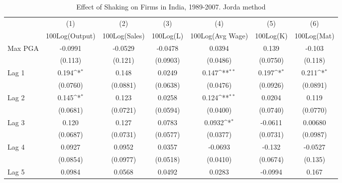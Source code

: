 \begin{table}[htbp]\centering
\def\sym#1{\ifmmode^{#1}\else\(^{#1}\)\fi}
\caption{Effect of Shaking on Firms in India, 1989-2007. Jorda method}
\begin{tabular}{l*{6}{c}}
\toprule
                &\multicolumn{1}{c}{(1)}&\multicolumn{1}{c}{(2)}&\multicolumn{1}{c}{(3)}&\multicolumn{1}{c}{(4)}&\multicolumn{1}{c}{(5)}&\multicolumn{1}{c}{(6)}\\
                &\multicolumn{1}{c}{100Log(Output)}&\multicolumn{1}{c}{100Log(Sales)}&\multicolumn{1}{c}{100Log(L)}&\multicolumn{1}{c}{100Log(Avg Wage)}&\multicolumn{1}{c}{100Log(K)}&\multicolumn{1}{c}{100Log(Mat)}\\
\midrule
Max PGA         &  -0.0991         &  -0.0529         &  -0.0478         &   0.0394         &    0.139         &   -0.103         \\
                &  (0.113)         &  (0.121)         & (0.0903)         & (0.0486)         & (0.0750)         &  (0.118)         \\
\addlinespace
Lag 1           &    0.194\sym{*}  &    0.148         &   0.0249         &    0.147\sym{**} &    0.197\sym{*}  &    0.211\sym{*}  \\
                & (0.0760)         & (0.0881)         & (0.0638)         & (0.0476)         & (0.0926)         & (0.0891)         \\
\addlinespace
Lag 2           &    0.145\sym{*}  &    0.123         &   0.0258         &    0.124\sym{**} &   0.0204         &    0.119         \\
                & (0.0681)         & (0.0721)         & (0.0594)         & (0.0400)         & (0.0740)         & (0.0770)         \\
\addlinespace
Lag 3           &    0.120         &    0.127         &   0.0783         &   0.0932\sym{*}  &  -0.0611         &  0.00680         \\
                & (0.0687)         & (0.0731)         & (0.0577)         & (0.0377)         & (0.0731)         & (0.0987)         \\
\addlinespace
Lag 4           &   0.0927         &   0.0952         &   0.0357         &  -0.0693         &   -0.132         &  -0.0527         \\
                & (0.0854)         & (0.0977)         & (0.0518)         & (0.0410)         & (0.0674)         &  (0.135)         \\
\addlinespace
Lag 5           &   0.0984         &   0.0568         &   0.0492         &   0.0283         &  -0.0994         &    0.167         \\

\end{tabular}
\end{table}
